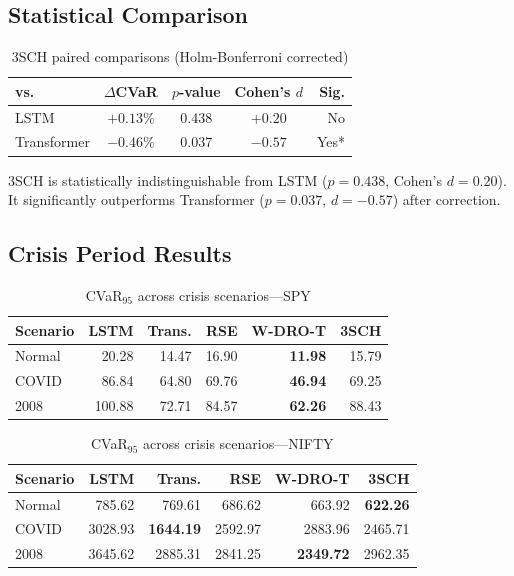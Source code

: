 \documentclass[11pt]{article}
\begin{document}
\subsection{Statistical Comparison}

\begin{table}[t]
\centering
\caption{3SCH paired comparisons (Holm-Bonferroni corrected)}
\label{tab:stats}
\small
\begin{tabular}{lcccr}
\toprule
\textbf{vs.} & \textbf{$\Delta$CVaR} & \textbf{$p$-value} & \textbf{Cohen's $d$} & \textbf{Sig.} \\
\midrule
LSTM & $+0.13\%$ & 0.438 & $+0.20$ & No \\
Transformer & $-0.46\%$ & 0.037 & $-0.57$ & Yes* \\
\bottomrule
\end{tabular}
\end{table}

3SCH is statistically indistinguishable from LSTM ($p = 0.438$, Cohen's $d = 0.20$). It significantly outperforms Transformer ($p = 0.037$, $d = -0.57$) after correction.

\subsection{Crisis Period Results}

\begin{table}[t]
\centering
\caption{CVaR$_{95}$ across crisis scenarios---SPY}
\label{tab:crisis_spy}
\small
\begin{tabular}{lrrrrr}
\toprule
\textbf{Scenario} & \textbf{LSTM} & \textbf{Trans.} & \textbf{RSE} & \textbf{W-DRO-T} & \textbf{3SCH} \\
\midrule
Normal & 20.28 & 14.47 & 16.90 & \textbf{11.98} & 15.79 \\
COVID & 86.84 & 64.80 & 69.76 & \textbf{46.94} & 69.25 \\
2008 & 100.88 & 72.71 & 84.57 & \textbf{62.26} & 88.43 \\
\bottomrule
\end{tabular}
\end{table}

\begin{table}[t]
\centering
\caption{CVaR$_{95}$ across crisis scenarios---NIFTY}
\label{tab:crisis_nifty}
\small
\begin{tabular}{lrrrrr}
\toprule
\textbf{Scenario} & \textbf{LSTM} & \textbf{Trans.} & \textbf{RSE} & \textbf{W-DRO-T} & \textbf{3SCH} \\
\midrule
Normal & 785.62 & 769.61 & 686.62 & 663.92 & \textbf{622.26} \\
COVID & 3028.93 & \textbf{1644.19} & 2592.97 & 2883.96 & 2465.71 \\
2008 & 3645.62 & 2885.31 & 2841.25 & \textbf{2349.72} & 2962.35 \\
\bottomrule
\end{tabular}
\end{table}
\end{document}
